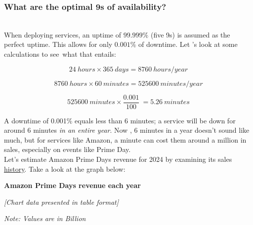 \subsubsection{What are the optimal 9s of availability?}\label{D6MMbghEya9v3uB2YCgjw}
\\
When deploying services, an uptime of \protect{}\label{katex_inline_fS2Drs4038AVLkjC71RJ-}{{{\(99.999 \%\)}}} (five 9s) is assumed as the perfect uptime. This allows for only \protect{}\label{katex_inline_Btwc7N7UI1-c_K9O9FPwu}{{{\(0.001 \%\)}}} of downtime. Let 's look at some calculations to see~what that entails:

\[
24\ hours \times 365\ days = 8760\ hours/year
\]

\[
8760\ hours \times 60\ minutes = 525600\ minutes/year
\]

\[
525600\ minutes \times \frac{0.001}{100}\ = 5.26\ minutes
\]

A downtime of 0.001\% equals less than 6 minutes; a service will be down for around 6 minutes \emph{in an entire year}. Now , 6 minutes in a year doesn't sound like much, but for services like Amazon, a minute can cost them around a million in sales, especially on events like Prime Day.
\\
Let's estimate Amazon Prime Day\textquotesingle s revenue for 2024 by examining its sales \href{https://capitaloneshopping.com/research/amazon-prime-day-statistics/}{history}. Take a look at the graph below:

\textbf{Amazon Prime Days revenue each year}

\textit{\small [Chart data presented in table format]}

\begin{table}[htbp]
\centering
\small
{}
\caption{The expected revenue of Amazon in 2024 (in green).}
\label{tab:chart}

\textit{\small Note: Values are in Billion}
\end{table}

